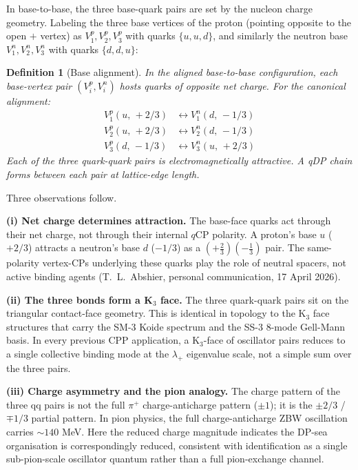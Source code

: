 \documentclass[11pt,letterpaper]{article}
\newtheorem{definition}[theorem]{Definition}
\newcommand{\qCP}{q\mathrm{CP}}
\begin{document}
In base-to-base, the three base-quark pairs are set by the nucleon charge geometry. Labeling the three base vertices of the proton (pointing opposite to the open $+$ vertex) as $V_1^p, V_2^p, V_3^p$ with quarks $\{u, u, d\}$, and similarly the neutron base $V_1^n, V_2^n, V_3^n$ with quarks $\{d, d, u\}$:

\begin{definition}[Base alignment]
\label{def:alignment}
In the aligned base-to-base configuration, each base-vertex pair $(V_i^p, V_i^n)$ hosts quarks of opposite net charge. For the canonical alignment:
\begin{align*}
V_1^p(u,\,+2/3) &\leftrightarrow V_1^n(d,\,-1/3) \\
V_2^p(u,\,+2/3) &\leftrightarrow V_2^n(d,\,-1/3) \\
V_3^p(d,\,-1/3) &\leftrightarrow V_3^n(u,\,+2/3)
\end{align*}
Each of the three quark-quark pairs is electromagnetically attractive. A qDP chain forms between each pair at lattice-edge length.
\end{definition}

Three observations follow.

\textbf{(i) Net charge determines attraction.} The base-face quarks act through their net charge, not through their internal $\qCP$ polarity. A proton's base $u$ ($+2/3$) attracts a neutron's base $d$ ($-1/3$) as a $(+\tfrac{2}{3})(-\tfrac{1}{3})$ pair. The same-polarity vertex-CPs underlying these quarks play the role of neutral spacers, not active binding agents (T.~L.~Abshier, personal communication, 17 April 2026).

\textbf{(ii) The three bonds form a K$_3$ face.} The three quark-quark pairs sit on the triangular contact-face geometry. This is identical in topology to the K$_3$ face structures that carry the SM-3 Koide spectrum and the SS-3 8-mode Gell-Mann basis. In every previous CPP application, a K$_3$-face of oscillator pairs reduces to a single collective binding mode at the $\lambda_+$ eigenvalue scale, not a simple sum over the three pairs.

\textbf{(iii) Charge asymmetry and the pion analogy.} The charge pattern of the three qq pairs is not the full $\pi^+$ charge-anticharge pattern ($\pm 1$); it is the $\pm 2/3$ / $\mp 1/3$ partial pattern. In pion physics, the full charge-anticharge ZBW oscillation carries $\sim 140$ MeV. Here the reduced charge magnitude indicates the DP-sea organisation is correspondingly reduced, consistent with identification as a single sub-pion-scale oscillator quantum rather than a full pion-exchange channel.
\end{document}
